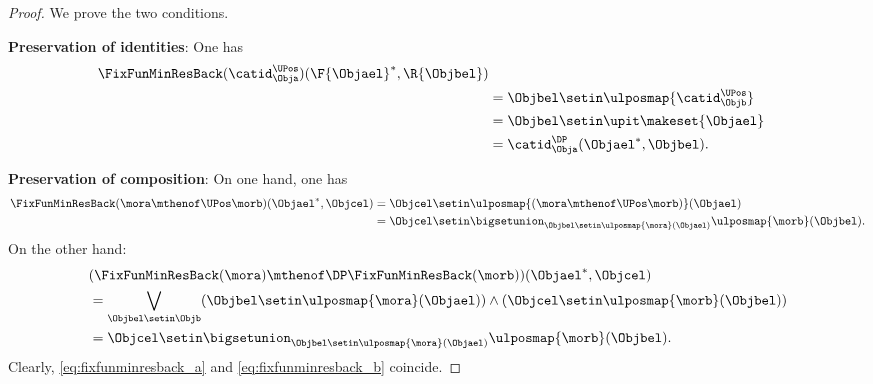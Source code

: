 \begin{proof}
    We prove the two conditions.

    \textbf{Preservation of identities}:
    One has
    \begin{equation}
        \begin{aligned}
            \FixFunMinResBack(\catid_{\Obja}^{\UPos})(\F{\Objael}^*,\R{\Objbel}) \\
             & =
            \Objbel \setin \ulposmap{\catid_{\Objb}^{\UPos}} \\
             & =\Objbel \setin \upit \makeset{ \Objael} \\
             & =\catid_{\Obja}^{\DP}(\Objael^*,\Objbel).
        \end{aligned}
    \end{equation}

    \textbf{Preservation of composition}:
    On one hand, one has
    \begin{equation}
        \label{eq:fixfunminresback_a}
        \begin{aligned}
            \FixFunMinResBack(\mora\mthenof\UPos \morb)(\Objael^*,\Objcel) & =
            \Objcel \setin \ulposmap{(\mora \mthenof\UPos \morb)}(\Objael) \\
                                                                           & =\Objcel \setin \bigsetunion_{\Objbel\setin \ulposmap{\mora}(\Objael)}\ulposmap{\morb}(\Objbel).
        \end{aligned}
    \end{equation}
    On the other hand:
    \begin{equation}
        \label{eq:fixfunminresback_b}
        \begin{aligned}
             & (\FixFunMinResBack(\mora)\mthenof\DP \FixFunMinResBack(\morb))(\Objael^*,\Objcel) \\
             & =
            \bigvee_{\Objbel \setin \Objb}(\Objbel \setin \ulposmap{\mora}(\Objael))\wedge (\Objcel\setin \ulposmap{\morb}(\Objbel)) \\
             & =\Objcel \setin \bigsetunion_{\Objbel\setin \ulposmap{\mora}(\Objael)}\ulposmap{\morb}(\Objbel).
        \end{aligned}
    \end{equation}
    Clearly, \cref{eq:fixfunminresback_a} and \cref{eq:fixfunminresback_b} coincide.
\end{proof}

